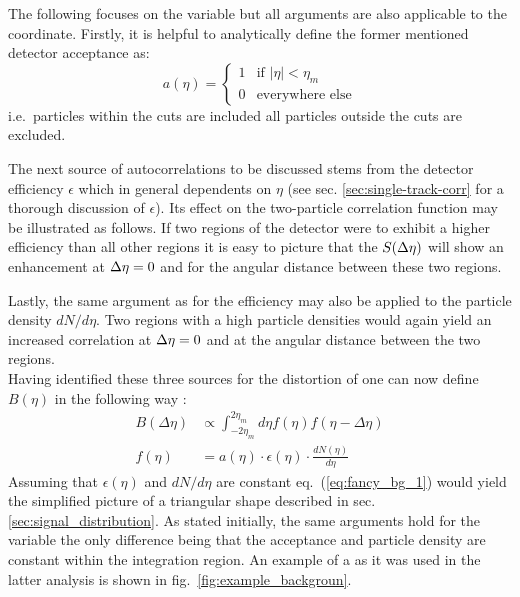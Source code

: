 The following focuses on the \deta variable but all arguments are also applicable to the \dphi coordinate. Firstly, it is helpful to analytically define the former mentioned detector acceptance as:
\begin{equation}
  \label{eq:acc}
  a(\eta ) =
  \begin{cases}
  1 & \text{if } |\eta| < \eta_m \\
  0 & \text{everywhere else}
  \end{cases}
\end{equation}
i.e.\ particles within the cuts are included all particles outside the cuts are excluded.

The next source of autocorrelations to be discussed stems from the detector efficiency $\epsilon$ which in general dependents on $\eta$ (see sec. \ref{sec:single-track-corr} for a thorough discussion of $\epsilon$). Its effect on the two-particle correlation function may be illustrated as follows. If two regions of the detector were to exhibit a higher efficiency than all other regions it is easy to picture that the $S(\Delta\eta)$ will show an enhancement at $\Delta\eta = 0$ and for the angular distance \deta between these two regions. 

Lastly, the same argument as for the efficiency may also be applied to the particle density $dN/d\eta$. Two regions with a high particle densities would again yield an increased correlation at $\Delta\eta = 0$ and at the angular distance between the two regions.\\

Having identified these three sources for the distortion of \Sig one can now define $B(\eta)$ in the following way \cite{Xu2013, Schuster2013}:
\begin{align}
  \label{eq:fancy_bg_1}
  B(\Delta\eta) &\propto \int_{-2\eta_m}^{2\eta_m} d\eta f(\eta) f(\eta - \Delta\eta) \\
  \label{eq:fancy_bg_2}
  f(\eta) &= a(\eta) \cdot \epsilon(\eta) \cdot \frac{dN(\eta)}{d\eta}
\end{align}
Assuming that $\epsilon(\eta)$ and $dN/d\eta$ are constant eq.~(\ref{eq:fancy_bg_1}) would yield the simplified picture of a triangular shape described in sec. \ref{sec:signal_distribution}. As stated initially, the same arguments hold for the \dphi variable the only difference being that the acceptance and particle density are constant within the integration region. An example of a \B as it was used in the latter analysis is shown in fig.~\ref{fig:example_backgroun}.\\

